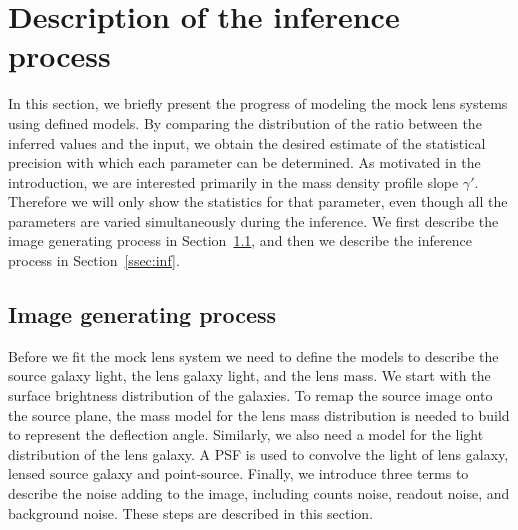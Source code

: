 \documentclass[a4paper,11pt]{article}
\begin{document}


\section{Description of the inference process}


In this section, we briefly present the progress of modeling the mock
lens systems using defined models. By comparing the distribution of
the ratio between the inferred values and the input, we obtain the
desired estimate of the statistical precision with which each
parameter can be determined. As motivated in the introduction, we are
interested primarily in the mass density profile slope
$\gamma'$. Therefore we will only show the statistics for that
parameter, even though all the parameters are varied simultaneously
during the inference. We first describe the image generating process
in Section~\ref{ssec:image}, and then we describe the inference process in
Section~\ref{ssec:inf}.

\subsection{Image generating process}
\label{ssec:image}

Before we fit the mock lens system we need to define the models to
describe the source galaxy light, the lens galaxy light, and the lens
mass. We start with the surface brightness distribution of the
galaxies. To remap the source image onto the source plane, the mass
model for the lens mass distribution is needed to build to represent
the deflection angle. Similarly, we also need a model for the light
distribution of the lens galaxy. A PSF is used to convolve the light
of lens galaxy, lensed source galaxy and point-source. Finally, we
introduce three terms to describe the noise adding to the image,
including counts noise, readout noise, and background noise. These
steps are described in this section.
\end{document}
